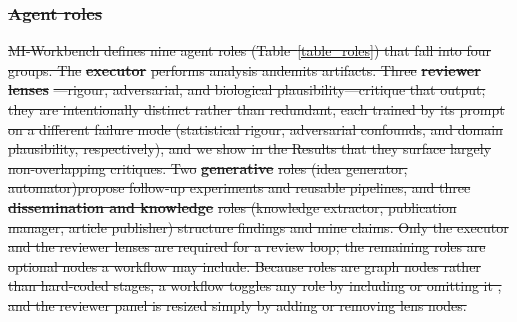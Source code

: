 \documentclass[10pt,letterpaper]{article}
\providecommand{\DIFdeltex}[1]{{\protect\color{red}\sout{#1}}}                      %
\providecommand{\DIFdelbegin}{} %
\providecommand{\DIFdel}[1]{\texorpdfstring{\DIFdeltex{#1}}{}} %
\newcommand{\DIFscaledelfig}{0.5}
\newlength{\DIFdelgraphicswidth} %
\newlength{\DIFdelgraphicsheight} %
\newcommand{\DIFdelincludegraphics}[2][]{%
\sbox{\DIFdelgraphicsbox}{\DIFOincludegraphics[#1]{#2}}%
\settoboxwidth{\DIFdelgraphicswidth}{\DIFdelgraphicsbox} %
\settoboxtotalheight{\DIFdelgraphicsheight}{\DIFdelgraphicsbox} %
\scalebox{\DIFscaledelfig}{%
\parbox[b]{\DIFdelgraphicswidth}{\usebox{\DIFdelgraphicsbox}\\[-\baselineskip] \rule{\DIFdelgraphicswidth}{0em}}\llap{\resizebox{\DIFdelgraphicswidth}{\DIFdelgraphicsheight}{%
\setlength{\unitlength}{\DIFdelgraphicswidth}%
\begin{picture}(1,1)%
\thicklines\linethickness{2pt} %
{\color[rgb]{1,0,0}\put(0,0){\framebox(1,1){}}}%
{\color[rgb]{1,0,0}\put(0,0){\line( 1,1){1}}}%
{\color[rgb]{1,0,0}\put(0,1){\line(1,-1){1}}}%
\end{picture}%
}\hspace*{3pt}}} %
} %
\DeclareRobustCommand{\DIFdelbegin}{\DIFOdelbegin \let\includegraphics\DIFdelincludegraphics} %
\begin{document}
\DIFdelbegin \subsubsection*{\DIFdel{Agent roles}}
\DIFdel{MI-Workbench defines nine agent roles (Table~\ref{table_roles}) that fall into four groups. The }\textbf{\DIFdel{executor}} %
\DIFdel{performs analysis andemits artifacts. Three }\textbf{\DIFdel{reviewer lenses}}%
\DIFdel{---rigour, adversarial, and biological plausibility---critique that output; they are intentionally distinct rather than redundant, each trained by its prompt on a different failure mode (statistical rigour, adversarial confounds, and domain plausibility, respectively), and we show in the Results that they surface largely non-overlapping critiques. Two }\textbf{\DIFdel{generative}} %
\DIFdel{roles (idea generator, automator)propose follow-up experiments and reusable pipelines, and three }\textbf{\DIFdel{dissemination and knowledge}} %
\DIFdel{roles (knowledge extractor, publication manager, article publisher) structure findings and mine claims. Only the executor and the reviewer lenses are required for a review loop; the remaining roles are optional nodes a workflow may include. Because roles are graph nodes rather than hard-coded stages, a workflow toggles any role by including or omitting it , and the reviewer panel is resized simply by adding or removing lens nodes.
}%
\end{document}
